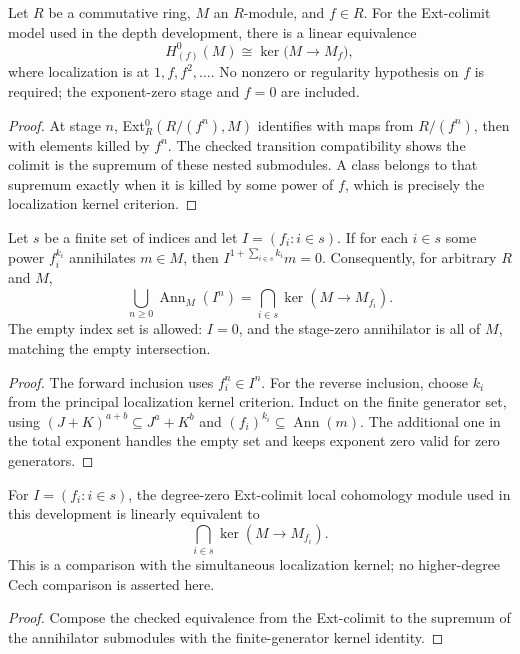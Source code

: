 \begin{theorem}\label{thm:principal-degree-zero-localization}
Let $R$ be a commutative ring, $M$ an $R$-module, and $f\in R$. For the
Ext-colimit model used in the depth development, there is a linear equivalence
\[
 H^0_{(f)}(M)\cong\ker\bigl(M\longrightarrow M_f\bigr),
\]
where localization is at $1,f,f^2,\ldots$. No nonzero or regularity hypothesis
on $f$ is required; the exponent-zero stage and $f=0$ are included.
\leanok
\end{theorem}
\begin{proof}
At stage $n$, Ext$^0_R(R/(f^n),M)$ identifies with maps from $R/(f^n)$,
then with elements killed by $f^n$. The checked transition compatibility
shows the colimit is the supremum of these nested submodules. A class belongs
to that supremum exactly when it is killed by some power of $f$, which is
precisely the localization kernel criterion.
\end{proof}

\begin{lemma}\label{lem:finite-generator-power-torsion}
Let $s$ be a finite set of indices and let $I=(f_i : i\in s)$. If for each
$i\in s$ some power $f_i^{k_i}$ annihilates $m\in M$, then
$I^{1+\sum_{i\in s} k_i}m=0$. Consequently, for arbitrary $R$ and $M$,
\[
  \bigcup_{n\ge 0}\operatorname{Ann}_M(I^n)
  =\bigcap_{i\in s}\ker(M\to M_{f_i}).
\]
The empty index set is allowed: $I=0$, and the stage-zero annihilator is all
of $M$, matching the empty intersection.
\leanok
\end{lemma}
\begin{proof}
The forward inclusion uses $f_i^n\in I^n$. For the reverse inclusion, choose
$k_i$ from the principal localization kernel criterion. Induct on the finite
generator set, using $(J+K)^{a+b}\subseteq J^a+K^b$ and
$(f_i)^{k_i}\subseteq\operatorname{Ann}(m)$. The additional one in the total
exponent handles the empty set and keeps exponent zero valid for zero
generators.
\end{proof}

\begin{theorem}\label{thm:finite-generator-degree-zero-localization}
For $I=(f_i:i\in s)$, the degree-zero Ext-colimit local cohomology module
used in this development is linearly equivalent to
\[
  \bigcap_{i\in s}\ker(M\to M_{f_i}).
\]
This is a comparison with the simultaneous localization kernel; no
higher-degree Cech comparison is asserted here.
\leanok
\end{theorem}
\begin{proof}
Compose the checked equivalence from the Ext-colimit to the supremum of the
annihilator submodules with the finite-generator kernel identity.
\end{proof}


